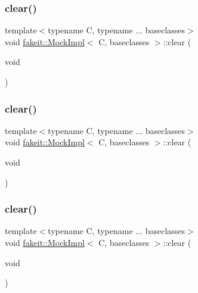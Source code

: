 \subsubsection{\texorpdfstring{clear()}{clear()}\hspace{0.1cm}{\footnotesize\ttfamily [2/9]}}
{\footnotesize\ttfamily template$<$typename C, typename ... baseclasses$>$ \\
void \mbox{\hyperlink{classfakeit_1_1MockImpl}{fakeit\+::\+Mock\+Impl}}$<$ C, baseclasses $>$\+::clear (\begin{DoxyParamCaption}\item[{void}]{ }\end{DoxyParamCaption})\hspace{0.3cm}{\ttfamily [inline]}}

\mbox{\label{classfakeit_1_1MockImpl_a3985505d2ec7bd50a5d71f155c5ae458}} 
\subsubsection{\texorpdfstring{clear()}{clear()}\hspace{0.1cm}{\footnotesize\ttfamily [3/9]}}
{\footnotesize\ttfamily template$<$typename C, typename ... baseclasses$>$ \\
void \mbox{\hyperlink{classfakeit_1_1MockImpl}{fakeit\+::\+Mock\+Impl}}$<$ C, baseclasses $>$\+::clear (\begin{DoxyParamCaption}\item[{void}]{ }\end{DoxyParamCaption})\hspace{0.3cm}{\ttfamily [inline]}}

\mbox{\label{classfakeit_1_1MockImpl_a3985505d2ec7bd50a5d71f155c5ae458}} 
\subsubsection{\texorpdfstring{clear()}{clear()}\hspace{0.1cm}{\footnotesize\ttfamily [4/9]}}
{\footnotesize\ttfamily template$<$typename C, typename ... baseclasses$>$ \\
void \mbox{\hyperlink{classfakeit_1_1MockImpl}{fakeit\+::\+Mock\+Impl}}$<$ C, baseclasses $>$\+::clear (\begin{DoxyParamCaption}\item[{void}]{ }\end{DoxyParamCaption})\hspace{0.3cm}{\ttfamily [inline]}}

